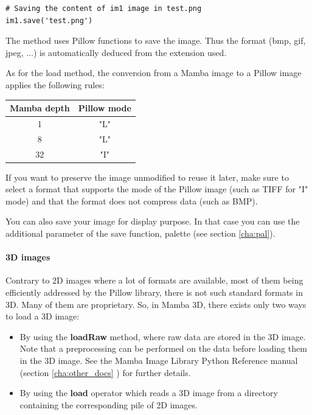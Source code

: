 \documentclass[a4paper,10pt,oneside]{article}
\begin{document}
\lstset{language=Python}
\begin{lstlisting}
# Saving the content of im1 image in test.png
im1.save('test.png')
\end{lstlisting}

The method uses Pillow functions to save the image. Thus the format (bmp, gif, 
jpeg, ...) is automatically deduced from the extension used.

As for the load method, the conversion from a Mamba image to a Pillow image
applies the following rules:

\begin{center}
\begin{tabular}{|c|c|}
  \hline
  Mamba depth & Pillow mode \\
  \hline
  1 & "L"\\
  8 & "L"\\
  32 & "I"\\
  \hline
\end{tabular}
\end{center}

If you want to preserve the image unmodified to reuse it later, make sure to
select a format that supports the mode of the Pillow image (such as TIFF for
"I" mode) and that the format does not compress data (such as BMP).

You can also save your image for display purpose. In that case you can use the
additional parameter of the save function, palette (see section \ref{cha:pal}).

\paragraph{3D images\\}

Contrary to 2D images where a lot of formats are available, most of them being efficiently addressed by the
Pillow library, there is not such standard formats in 3D. Many of them are proprietary. So, in Mamba 3D, there
exists only two ways to load a 3D image:

\begin{itemize}
\item By using the \textbf{loadRaw} method, where raw data are stored in the 3D image. Note that a preprocessing can
be performed on the data before loading them in the 3D image. See
the Mamba Image Library Python Reference manual (section \ref{cha:other_docs} ) for further details. 
\item By using the \textbf{load} operator which reads a 3D image from a directory containing the corresponding pile
of 2D images.
\end{itemize}
\end{document}
